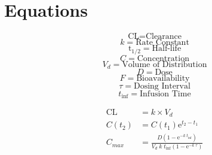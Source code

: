 \documentclass[main.tex]{subfiles}
\begin{document}
	
\newcommand{\cl}{\text{CL}}
\newcommand{\e}[1]{\mathrm{e}^{#1}}
\newcommand{\thl}{\mathrm{t}_{1/2}}
\newcommand{\tinf}{t_{\text{inf}}}
	
\section{Equations}
\begin{multicols}{3}
	$$\cl = \text{Clearance}$$
	$$k = \text{Rate Constant}$$
	$$\thl = \text{Half-life}$$
	$$C = \text{Concentration}$$
	$$V_d = \text{Volume of Distribution}$$
	$$D = \text{Dose}$$
	$$F = \text{Bioavailability}$$
	$$\tau = \text{Dosing Interval}$$
	$$\tinf = \text{Infusion Time}$$
\end{multicols}

\begin{align}
	\cl &= k\times V_d \\
	C(t_2) &= C(t_1) \e{t_2-t_1} \\
	C_{max} &= \frac{D \left(1-\e{-k \; \tinf}\right)}{V_d \; k \; \tinf \left(1-\e{-k \; \tau}\right)}
\end{align}

	
\end{document}
